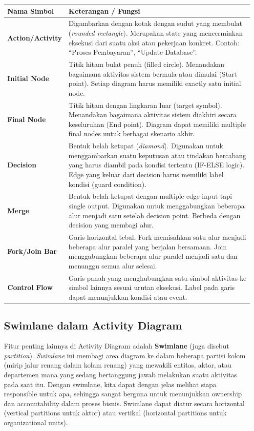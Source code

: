 \documentclass[12pt,a4paper]{article}
\begin{document}
\begin{table}[h]
\centering
\begin{tabular}{@{}p{3cm}p{10.5cm}@{}}
\toprule
\textbf{Nama Simbol} & \textbf{Keterangan / Fungsi} \\ \midrule
\textbf{Action/Activity} & Digambarkan dengan kotak dengan sudut yang membulat (\textit{rounded rectangle}). Merupakan state yang mencerminkan eksekusi dari suatu aksi atau pekerjaan konkret. Contoh: ``Proses Pembayaran'', ``Update Database''. \\ \addlinespace
\textbf{Initial Node} & Titik hitam bulat penuh (filled circle). Menandakan bagaimana aktivitas sistem bermula atau dimulai (Start point). Setiap diagram harus memiliki exactly satu initial node. \\ \addlinespace
\textbf{Final Node} & Titik hitam dengan lingkaran luar (target symbol). Menandakan bagaimana aktivitas sistem diakhiri secara keseluruhan (End point). Diagram dapat memiliki multiple final nodes untuk berbagai skenario akhir. \\ \addlinespace
\textbf{Decision} & Bentuk belah ketupat (\textit{diamond}). Digunakan untuk menggambarkan suatu keputusan atau tindakan bercabang yang harus diambil pada kondisi tertentu (IF-ELSE logic). Edge yang keluar dari decision harus memiliki label kondisi (guard condition). \\ \addlinespace
\textbf{Merge} & Bentuk belah ketupat dengan multiple edge input tapi single output. Digunakan untuk menggabungkan beberapa alur menjadi satu setelah decision point. Berbeda dengan decision yang membagi alur. \\ \addlinespace
\textbf{Fork/Join Bar} & Garis horizontal tebal. Fork memisahkan satu alur menjadi beberapa alur paralel yang berjalan bersamaan. Join menggabungkan beberapa alur paralel menjadi satu dan menunggu semua alur selesai. \\ \addlinespace
\textbf{Control Flow} & Garis panah yang menghubungkan satu simbol aktivitas ke simbol lainnya sesuai urutan eksekusi. Label pada garis dapat menunjukkan kondisi atau event. \\ \bottomrule
\end{tabular}
\end{table}

\subsection{Swimlane dalam Activity Diagram}

Fitur penting lainnya di Activity Diagram adalah \textbf{Swimlane} (juga disebut \textit{partition}). \textit{Swimlane} ini membagi area diagram ke dalam beberapa partisi kolom (mirip jalur renang dalam kolam renang) yang mewakili entitas, aktor, atau departemen mana yang sedang bertanggung jawab melakukan suatu aktivitas pada saat itu. Dengan swimlane, kita dapat dengan jelas melihat siapa responsible untuk apa, sehingga sangat berguna untuk menunjukkan ownership dan accountability dalam proses bisnis. Swimlane dapat diatur secara horizontal (vertical partitions untuk aktor) atau vertikal (horizontal partitions untuk organizational units).
\end{document}
